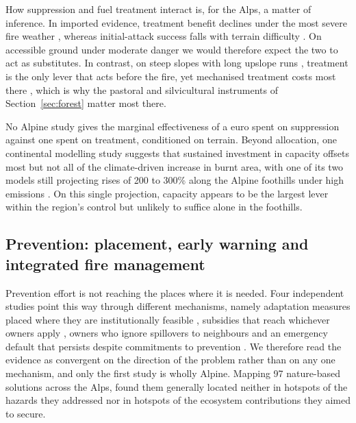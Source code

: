 \documentclass[11pt,a4paper]{article}
\begin{document}
How suppression and fuel treatment interact is, for the Alps, a matter of inference. In imported evidence, treatment benefit declines under the most severe fire weather \citep{brodie_forest_2024}, whereas initial-attack success falls with terrain difficulty \citep{cardil_assessing_2025}. On accessible ground under moderate danger we would therefore expect the two to act as substitutes. In contrast, on steep slopes with long upslope runs \citep{conedera_linking_2024}, treatment is the only lever that acts before the fire, yet mechanised treatment costs most there \citep{dinca_timber_2025}, which is why the pastoral and silvicultural instruments of Section~\ref{sec:forest} matter most there.

No Alpine study gives the marginal effectiveness of a euro spent on suppression against one spent on treatment, conditioned on terrain. Beyond allocation, one continental modelling study suggests that sustained investment in capacity offsets most but not all of the climate-driven increase in burnt area, with one of its two models still projecting rises of 200 to 300\% along the Alpine foothills under high emissions \citep{billing_future_2026}. On this single projection, capacity appears to be the largest lever within the region's control but unlikely to suffice alone in the foothills.

\subsection{Prevention: placement, early warning and integrated fire management}

Prevention effort is not reaching the places where it is needed. Four independent studies point this way through different mechanisms, namely adaptation measures placed where they are institutionally feasible \citep{dubo_nature-based_2023}, subsidies that reach whichever owners apply \citep{gorrizmifsud_current_2026}, owners who ignore spillovers to neighbours \citep{bayham_economics_2022} and an emergency default that persists despite commitments to prevention \citep{kirschner_governance_2024}. We therefore read the evidence as convergent on the direction of the problem rather than on any one mechanism, and only the first study is wholly Alpine. Mapping 97 nature-based solutions across the Alps, \citet{dubo_nature-based_2023} found them generally located neither in hotspots of the hazards they addressed nor in hotspots of the ecosystem contributions they aimed to secure.
\end{document}

